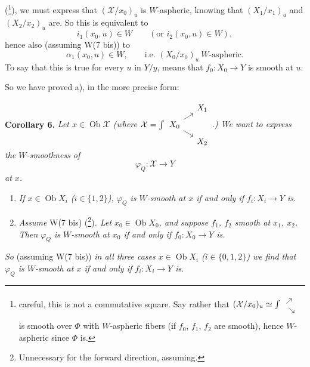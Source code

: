 \documentclass[11pt]{article}
\newcommand{\printedpage}[1]{\marginpar{\footnotesize p.~#1}}
\newcommand{\msp}[1]{\marginpar{\footnotesize [#1]}}
\newcommand{\Ob}{\operatorname{Ob}}
\begin{document}
\printedpage{108}
(\footnote[107]{careful, this is not a commutative square. Say rather that $(\mathcal{X}/x_0)_u \simeq \int \begin{tikzcd}[ampersand replacement=\&, row sep=0.4em, column sep=0.4em, baseline=(\tikzcdmatrixname-2-1.base)] \& {} \\ {} \ar[ur]\ar[dr] \& \\ \& {} \end{tikzcd}$ is smooth over $\Phi$ with $W$-aspheric fibers (if $f_0$, $f_1$, $f_2$ are smooth), hence $W$-aspheric since $\Phi$ is.}), we must express that $(\mathcal{X}/x_0)_u$ is $W$-aspheric, knowing that $(X_1/x_1)_u$ and $(X_2/x_2)_u$ are. So this is equivalent to %
\[
i_1(x_0,u) \in W \qquad (\text{or } i_2(x_0,u) \in W),
\]
hence also (assuming W(7 bis)) to
\msp{page 157}
\[
\alpha_1(x_0,u) \in W, \qquad \text{i.e. } (X_0/x_0)_u \ W\text{-aspheric.}
\]
To say that this is true for every $u$ in $Y/y$, means that $f_0 : X_0 \longrightarrow Y$ is smooth at $u$.

So we have proved a), in the more precise form:

\textbf{Corollary 6.} \textit{Let $x \in \Ob \mathcal{X}$ (where $\mathcal{X} = \int \begin{tikzcd}[ampersand replacement=\&, row sep=tiny, column sep=small, baseline=(\tikzcdmatrixname-2-1.base)] \& X_1 \\ X_0 \ar[ur]\ar[dr] \& \\ \& X_2 \end{tikzcd}$.) We want to express the $W$-smoothness of}
\[
\varphi_Q : \mathcal{X} \longrightarrow Y
\]
\textit{at $x$.}

\begin{enumerate}[label={}, leftmargin=2.5em]
\item[\textit{a)}] \textit{If $x \in \Ob X_i$ ($i \in \{1,2\}$), $\varphi_Q$ is $W$-smooth at $x$ if and only if $f_i : X_i \longrightarrow Y$ is.}
\item[\textit{b)}] \textit{Assume} \textup{W(7 bis)} (\footnote[108]{Unnecessary for the forward direction, assuming.})\textit{. Let $x_0 \in \Ob X_0$, and suppose $f_1$, $f_2$ smooth at $x_1$, $x_2$. Then $\varphi_Q$ is $W$-smooth at $x_0$ if and only if $f_0 : X_0 \longrightarrow Y$ is.}
\end{enumerate}

\textit{So} (assuming W(7 bis)) \textit{in all three cases $x \in \Ob X_i$ ($i \in \{0,1,2\}$) we find that $\varphi_Q$ is $W$-smooth at $x$ if and only if $f_i : X_i \longrightarrow Y$ is}.
\end{document}
